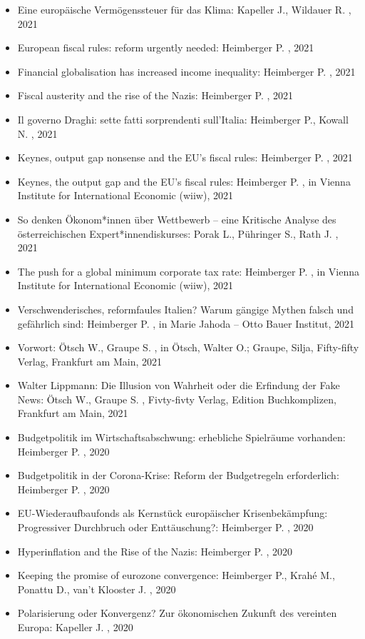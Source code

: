 \begin{itemize}
\item Eine europäische Vermögenssteuer für das Klima: Kapeller J., Wildauer R. , 2021
\item European fiscal rules: reform urgently needed: Heimberger P. , 2021
\item Financial globalisation has increased income inequality: Heimberger P. , 2021
\item Fiscal austerity and the rise of the Nazis: Heimberger P. , 2021
\item Il governo Draghi: sette fatti sorprendenti sull’Italia: Heimberger P., Kowall N. , 2021
\item Keynes, output gap nonsense and the EU’s fiscal rules: Heimberger P. , 2021
\item Keynes, the output gap and the EU’s fiscal rules: Heimberger P. , in Vienna Institute for International Economic (wiiw), 2021
\item So denken Ökonom*innen über Wettbewerb – eine Kritische Analyse des österreichischen Expert*innendiskurses: Porak L., Pühringer S., Rath J. , 2021
\item The push for a global minimum corporate tax rate: Heimberger P. , in Vienna Institute for International Economic (wiiw), 2021
\item Verschwenderisches, reformfaules Italien? Warum gängige Mythen falsch und gefährlich sind: Heimberger P. , in Marie Jahoda – Otto Bauer Institut, 2021
\item Vorwort: Ötsch W., Graupe S. , in Ötsch, Walter O.; Graupe, Silja, Fifty-fifty Verlag, Frankfurt am Main, 2021
\item Walter Lippmann: Die Illusion von Wahrheit oder die Erfindung der Fake News: Ötsch W., Graupe S. , Fivty-fivty Verlag, Edition Buchkomplizen, Frankfurt am Main, 2021
\item Budgetpolitik im Wirtschaftsabschwung: erhebliche Spielräume vorhanden: Heimberger P. , 2020
\item Budgetpolitik in der Corona-Krise: Reform der Budgetregeln erforderlich: Heimberger P. , 2020
\item EU-Wiederaufbaufonds als Kernstück europäischer Krisenbekämpfung: Progressiver Durchbruch oder Enttäuschung?: Heimberger P. , 2020
\item Hyperinflation and the Rise of the Nazis: Heimberger P. , 2020
\item Keeping the promise of eurozone convergence: Heimberger P., Krahé M., Ponattu D., van't Klooster J. , 2020
\item Polarisierung oder Konvergenz? Zur ökonomischen Zukunft des vereinten Europa: Kapeller J. , 2020

\end{itemize}
